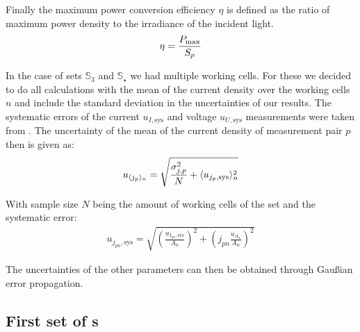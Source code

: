 \documentclass[a4paper,10pt,twocolumn]{article}
\begin{document}
\begin{extract*}
Finally the maximum power conversion efficiency $\eta$ is defined as the ratio of maximum power density to the irradiance of the incident light.
\begin{align}
	\eta = \frac{P_{\text{max}}}{S_p}
\end{align}

In the case of sets $\mathbb{S}_3$ and $\mathbb{S}_\star$ we had multiple working cells. For these we decided to do all calculations with the mean of the current density over the working cells $n$ and include the standard deviation in the uncertainties of our results. The systematic errors of the current $u_{I,\text{sys}}$ and voltage $u_{U,\text{sys}}$ measurements were taken from \cite{keithley}. The uncertainty of the mean of the current density of measurement pair $p$ then is given as:
\begin{align}
	u_{\langle j_p \rangle_n} = \sqrt{\frac{\sigma_{j,p}^2}{N} + \langle u_{j_p,\text{sys}} \rangle_n^2}
\end{align}

With sample size $N$ being the amount of working cells of the set and the systematic error:
\begin{align}
	u_{j_{pn},\text{sys}} = \sqrt{ \left( \frac{ u_{I_{pn},\text{sys}}}{A_n}\right)^2+\left( j_{pn}\frac{u_{A_n}}{A_n} \right)^2}
\end{align}

The uncertainties of the other parameters can then be obtained through Gaußian error propagation.

\subsection{First set of \BHSC s}\label{subsec:S1data}


\end{extract*}
\end{document}
